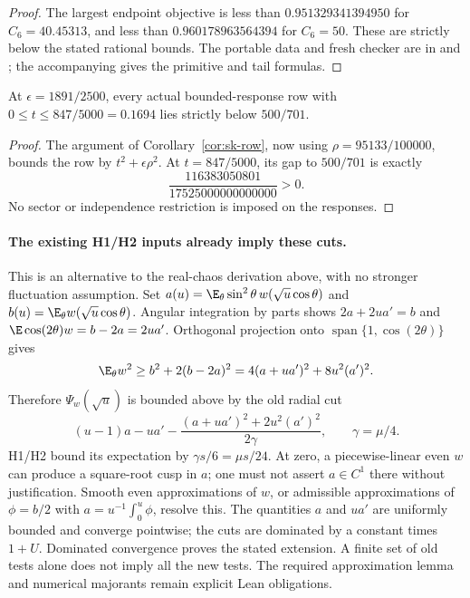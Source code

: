 \begin{proof}
The largest endpoint objective is less than
$0.951329341394950$ for $C_6=40.45313$, and less than
$0.960178963564394$ for $C_6=50$. These are strictly below the stated
rational bounds. The portable data and fresh checker are in
and ; the accompanying  gives the
primitive and tail formulas.
\end{proof}

\begin{corollary}
\label{cor:real-stein-small-t-20261021}
At $\epsilon=1891/2500$, every actual bounded-response row with
$0\le t\le847/5000=0.1694$ lies strictly below $500/701$.
\end{corollary}
\begin{proof}
The argument of Corollary~\ref{cor:sk-row}, now using
$\rho=95133/100000$, bounds the row by $t^2+\epsilon\rho^2$.
At $t=847/5000$, its gap to $500/701$ is exactly
\[
 \frac{116383050801}{17525000000000000}>0.
\]
No sector or independence restriction is imposed on the responses.
\end{proof}

\paragraph{The existing H1/H2 inputs already imply these cuts.}
This is an alternative to the real-chaos derivation above, with no
stronger fluctuation assumption. Set
$a(u)=\E_\theta\sin^2\theta\,w(\sqrt u\cos\theta)$ and
$b(u)=\E_\theta w(\sqrt u\cos\theta)$. Angular integration by parts
shows $2a+2ua'=b$ and
$\E\cos(2\theta)w=b-2a=2ua'$. Orthogonal projection onto
$\operatorname{span}\{1,\cos(2\theta)\}$ gives
\[
 \E_\theta w^2\ge b^2+2(b-2a)^2
 =4(a+ua')^2+8u^2(a')^2.
\]
Therefore $\Psi_w(\sqrt u)$ is bounded above by the old radial cut
\[
 (u-1)a-ua'-\frac{(a+ua')^2+2u^2(a')^2}{2\gamma},
 \qquad \gamma=\mu/4.
\]
H1/H2 bound its expectation by $\gamma s/6=\mu s/24$.
At zero, a piecewise-linear even $w$ can produce a square-root cusp
in $a$; one must not assert $a\in C^1$ there without justification.
Smooth even approximations of $w$, or admissible approximations of
$\phi=b/2$ with $a=u^{-1}\int_0^u\phi$, resolve this. The quantities
$a$ and $ua'$ are uniformly bounded and converge pointwise; the cuts
are dominated by a constant times $1+U$. Dominated convergence proves
the stated extension. A finite set of old tests alone does not imply
all the new tests. The required approximation lemma and numerical
majorants remain explicit Lean obligations.

